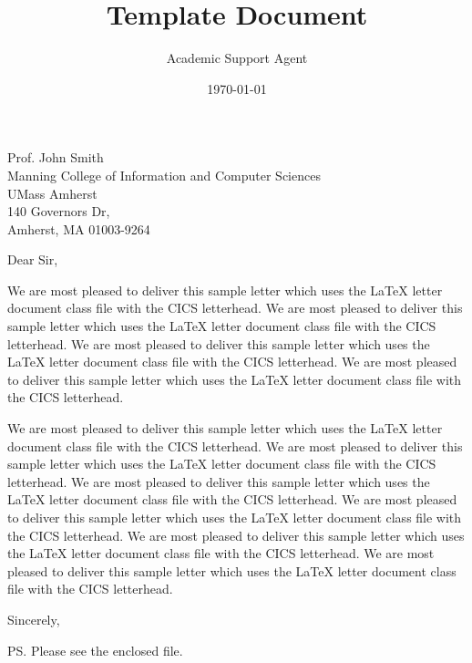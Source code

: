 \documentclass{article}
\title{Template Document}
\author{Academic Support Agent}
\date{\today}
\begin{document}
\maketitle

\begin{letter}{Prof. John Smith\\ 
               Manning College of Information and Computer Sciences\\ 
               UMass Amherst\\
               140 Governors Dr, \\
               Amherst, MA 01003-9264}

\opening{Dear Sir,}

We are most pleased to deliver this sample letter which uses
the \LaTeX{} letter document class file with the CICS letterhead.
We are most pleased to deliver this sample letter which uses
the \LaTeX{} letter document class file with the CICS letterhead.
We are most pleased to deliver this sample letter which uses
the \LaTeX{} letter document class file with the CICS letterhead.
We are most pleased to deliver this sample letter which uses
the \LaTeX{} letter document class file with the CICS letterhead.




We are most pleased to deliver this sample letter which uses
the \LaTeX{} letter document class file with the CICS letterhead.
We are most pleased to deliver this sample letter which uses
the \LaTeX{} letter document class file with the CICS letterhead.
We are most pleased to deliver this sample letter which uses
the \LaTeX{} letter document class file with the CICS letterhead.
We are most pleased to deliver this sample letter which uses
the \LaTeX{} letter document class file with the CICS letterhead.
We are most pleased to deliver this sample letter which uses
the \LaTeX{} letter document class file with the CICS letterhead.
We are most pleased to deliver this sample letter which uses
the \LaTeX{} letter document class file with the CICS letterhead.

\closing{Sincerely,}


\ps{Please see the enclosed file.}


\end{letter}
\end{document}
